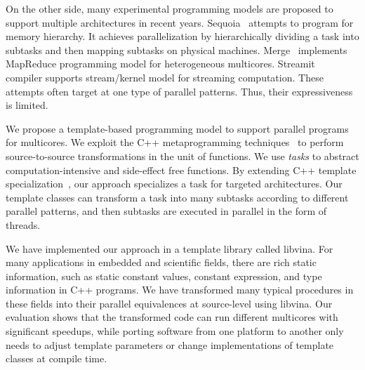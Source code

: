 On the other side, many experimental
programming models are proposed to support multiple architectures in recent years.
Sequoia~\cite{sequoia} attempts to program for memory hierarchy. It
achieves parallelization by hierarchically dividing a task into subtasks
and then mapping subtasks on physical machines. Merge~\cite{merge} implements
MapReduce programming model for heterogeneous
multicores. Streamit~\cite{ThiesKA02} compiler supports stream/kernel
model for streaming computation. These attempts often target at one type of
parallel patterns. Thus, their expressiveness is limited.



We propose a template-based programming model to
support parallel programs for multicores. We exploit the C++
metaprogramming techniques~\cite{tempmetaprog} to perform source-to-source transformations
in the unit of functions. We use \emph{tasks} to abstract
computation-intensive and side-effect free functions.
By extending C++ template
specialization~\cite{tcpl}, our approach specializes a task for targeted
architectures. Our template classes can transform a task into many subtasks
according to different parallel patterns, and then subtasks are executed in
parallel in the form of threads.


We have implemented our approach in a template library called libvina. For 
many applications in embedded and scientific fields, there are rich
static information, such as static constant values, constant
expression, and type information in C++ programs.
We have transformed many typical procedures in these fields into their parallel
equivalences at source-level using libvina. Our evaluation shows that the
transformed code can run different multicores with significant speedups, while
porting software from one platform to another only
needs to adjust template parameters or change implementations of
template classes at compile time. 

